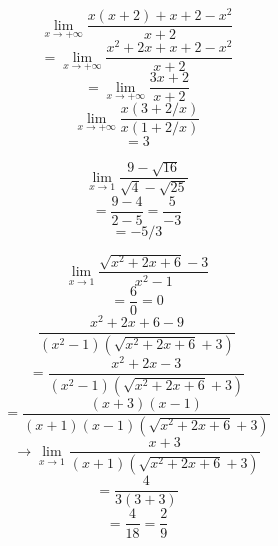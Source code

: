 \documentclass{article}
\begin{document}
\[ \lim_{x \to +\infty} \frac{x(x+2) + x+2 - x^2}{x+2} \]
\[ = \lim_{x \to +\infty} \frac{x^2+2x+x+2-x^2}{x+2} \]
\[ = \lim_{x \to +\infty} \frac{3x+2}{x+2} \]
\[ \lim_{x \to +\infty} \frac{x(3+2/x)}{x(1+2/x)}  \]
\[ = 3 \]

\[ \lim_{x \to 1} \frac{9 - \sqrt{16}}{\sqrt{4} - \sqrt{25}} \]
\[ = \frac{9 - 4}{2 - 5} = \frac{5}{-3} \]
\[ = -5/3 \]

\[ \lim_{x \to 1} \frac{\sqrt{x^2+2x+6} - 3}{x^2 - 1} \]
\[ = \frac{6}{0} = 0 \]
\[ \frac{x^2+2x+6-9}{(x^2-1)(\sqrt{x^2+2x+6}+3)} \]
\[ = \frac{x^2+2x-3}{(x^2-1)(\sqrt{x^2+2x+6}+3)} \]
\[ = \frac{(x+3)(x-1)}{(x+1)(x-1)(\sqrt{x^2+2x+6}+3)} \]
\[ \to \lim_{x \to 1} \frac{x+3}{(x+1)(\sqrt{x^2+2x+6}+3)} \]
\[ = \frac{4}{3(3+3)} \]
\[ = \frac{4}{18} = \frac{2}{9} \]
\end{document}
